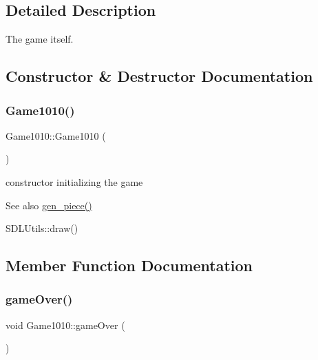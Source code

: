 \subsection{Detailed Description}
The game itself. 

\subsection{Constructor \& Destructor Documentation}
\mbox{\label{class_game1010_a0a0688219844edbe8f4a44c11a13e32a}} 
\subsubsection{\texorpdfstring{Game1010()}{Game1010()}}
{\footnotesize\ttfamily Game1010\+::\+Game1010 (\begin{DoxyParamCaption}{ }\end{DoxyParamCaption})\hspace{0.3cm}{\ttfamily [inline]}}



constructor initializing the game 

\begin{DoxySeeAlso}{See also}
\mbox{\hyperlink{class_game1010_a9576170947a355682c922cb648432b9e}{gen\+\_\+piece()}} 

S\+D\+L\+Utils\+::draw() 
\end{DoxySeeAlso}


\subsection{Member Function Documentation}
\mbox{\label{class_game1010_a3bc296b7ba6bffeda3baceb1240190b6}} 
\subsubsection{\texorpdfstring{game\+Over()}{gameOver()}}
{\footnotesize\ttfamily void Game1010\+::game\+Over (\begin{DoxyParamCaption}{ }\end{DoxyParamCaption})\hspace{0.3cm}{\ttfamily [inline]}}




